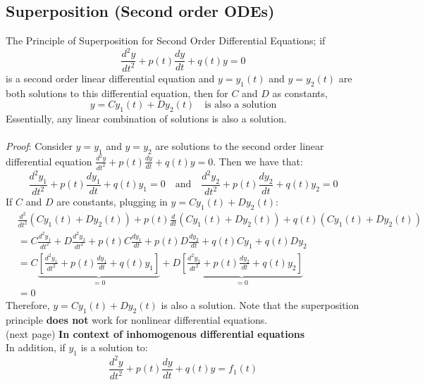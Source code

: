 \documentclass{report}
\begin{document}
\newpage

\subsection{Superposition (Second order ODEs)}%
The Principle of Superposition for Second Order Differential Equations; if
\begin{equation*}
\frac{d^2y}{dt^2}+p(t)\frac{dy}{dt}+q(t)y=0
\end{equation*}
is a second order linear differential equation and $y=y_1(t)$ and $y=y_2(t)$ are both
solutions to this differential equation, then for $C$ and $D$ as constants,
\begin{equation*}
y=Cy_1(t)+Dy_2(t)\quad\text{is also a solution}
\end{equation*}
Essentially, any linear combination of solutions is also a solution.\\
\vspace{1mm}\\
\textit{Proof}: Consider $y=y_1$ and $y=y_2$ are solutions to the second
order linear differential equation $\frac{d^2y}{dt^2}+p(t)\frac{dy}{dt}+q(t)y=0$. Then we have
that:
\begin{equation*}
\frac{d^2y_1}{dt^2}+p(t)\frac{dy_1}{dt}+q(t)y_1=0\quad\text{and}\quad\frac{d^2y_2}{dt^2}+p(t)\frac{dy_2}{dt}+q(t)y_2=0
\end{equation*}
If $C$ and $D$ are constants, plugging in $y=Cy_1(t)+Dy_2(t)$:
\begin{align*}
&\frac{d^2}{dt^2}(Cy_1(t)+Dy_2(t))+p(t)\frac{d}{dt}(Cy_1(t)+Dy_2(t))
+q(t)(Cy_1(t)+Dy_2(t))\\
&=C\frac{d^2y_1}{dt^2}+D\frac{d^2y_2}{dt^2}+p(t)C\frac{dy_1}{dt}+p(t)D\frac{dy_2}{dt}
+q(t)Cy_1+q(t)Dy_2\\
&=C\underbrace{\left[\frac{d^2y_1}{dt^2}+p(t)\frac{dy_1}{dt}+q(t)y_1\right]}_{=0}
+D\underbrace{\left[\frac{d^2y_2}{dt^2}+p(t)\frac{dy_2}{dt}+q(t)y_2\right]}_{=0}\\
&=0
\end{align*}
Therefore, $y=Cy_1(t)+Dy_2(t)$ is also a solution. Note that the superposition principle
\textbf{does not} work for nonlinear differential equations.\\
(next page)
\newpage
\noindent\textbf{In context of inhomogenous differential equations}\\ %
In addition, if $y_1$ is a solution to:
\begin{equation*}
\frac{d^2y}{dt^2}+p(t)\frac{dy}{dt}+q(t)y=f_1(t)
\end{equation*}
\end{document}
